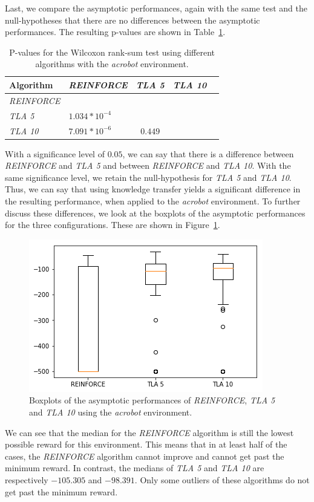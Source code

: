 Last, we compare the asymptotic performances, again with the same test and the null-hypotheses that there are no differences between the asymptotic performances. The resulting p-values are shown in Table~\ref{tab:nosparse:asymp:pvalues}.
\begin{table}[htb]
    \centering
    \begin{tabular}{llccc}
    \hline
    Algorithm & \textit{REINFORCE} & \textit{TLA 5} & \textit{TLA 10} \\
    \hline
       \textit{REINFORCE}  & & & \\
       \textit{TLA 5} & $1.034*10^{-4}$ & & \\
       \textit{TLA 10} & $7.091*10^{-6}$ & $0.449$ & \\
    \hline
    \end{tabular}
    \caption{P-values for the Wilcoxon rank-sum test using different algorithms with the \textit{acrobot} environment.}
    \label{tab:nosparse:asymp:pvalues}
\end{table}

With a significance level of $0.05$, we can say that there is a difference between \textit{REINFORCE} and \textit{TLA 5} and between \textit{REINFORCE} and \textit{TLA 10}.
With the same significance level, we retain the null-hypothesis for \textit{TLA 5} and \textit{TLA 10}.
Thus, we can say that using knowledge transfer yields a significant difference in the resulting performance, when applied to the \textit{acrobot} environment.
To further discuss these differences, we look at the boxplots of the asymptotic performances for the three configurations. These are shown in Figure~\ref{fig:nosparse:Acrobot:asymp_target_re-akt5-akt10}.
\begin{figure}[htb]
    \centering
    \includegraphics[width=.8\linewidth]{images/results/Acrobot/no_sparse_transfer/asymp_target_re-akt5-akt10.png}
    \caption{Boxplots of the asymptotic performances of \textit{REINFORCE}, \textit{TLA 5} and \textit{TLA 10} using the \textit{acrobot} environment.}
    \label{fig:nosparse:Acrobot:asymp_target_re-akt5-akt10}
\end{figure}
We can see that the median for the \textit{REINFORCE} algorithm is still the lowest possible reward for this environment. This means that in at least half of the cases, the \textit{REINFORCE} algorithm cannot improve and cannot get past the minimum reward. In contrast, the medians of \textit{TLA 5} and \textit{TLA 10} are respectively $-105.305$ and $-98.391$. Only some outliers of these algorithms do not get past the minimum reward.

